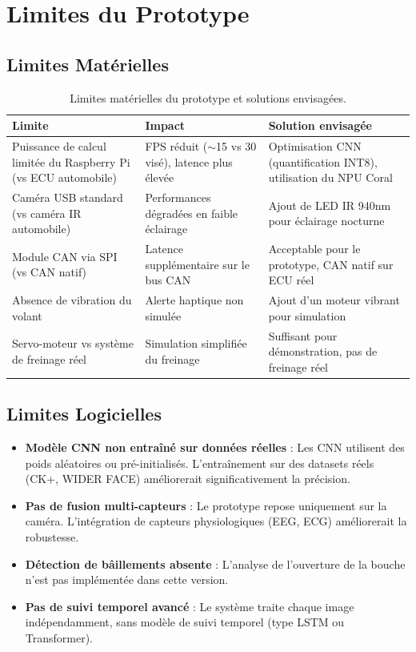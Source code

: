 \section{Limites du Prototype}

\subsection{Limites Matérielles}

\begin{table}[H]
\centering
\caption{Limites matérielles du prototype et solutions envisagées.}
\label{tab:limites_materielles}
\renewcommand{\arraystretch}{1.4}
\begin{tabularx}{\textwidth}{|X|X|X|}
\hline
\rowcolor{alertorange!20}
\textbf{Limite} & \textbf{Impact} & \textbf{Solution envisagée} \\
\hline
Puissance de calcul limitée du Raspberry Pi (vs ECU automobile) & FPS réduit ($\sim$15 vs 30 visé), latence plus élevée & Optimisation CNN (quantification INT8), utilisation du NPU Coral \\
\hline
Caméra USB standard (vs caméra IR automobile) & Performances dégradées en faible éclairage & Ajout de LED IR 940nm pour éclairage nocturne \\
\hline
Module CAN via SPI (vs CAN natif) & Latence supplémentaire sur le bus CAN & Acceptable pour le prototype, CAN natif sur ECU réel \\
\hline
Absence de vibration du volant & Alerte haptique non simulée & Ajout d'un moteur vibrant pour simulation \\
\hline
Servo-moteur vs système de freinage réel & Simulation simplifiée du freinage & Suffisant pour démonstration, pas de freinage réel \\
\hline
\end{tabularx}
\end{table}

\subsection{Limites Logicielles}

\begin{itemize}[leftmargin=2cm]
    \item \textbf{Modèle CNN non entraîné sur données réelles} : Les CNN utilisent des poids aléatoires ou pré-initialisés. L'entraînement sur des datasets réels (CK+, WIDER FACE) améliorerait significativement la précision.
    \item \textbf{Pas de fusion multi-capteurs} : Le prototype repose uniquement sur la caméra. L'intégration de capteurs physiologiques (EEG, ECG) améliorerait la robustesse.
    \item \textbf{Détection de bâillements absente} : L'analyse de l'ouverture de la bouche n'est pas implémentée dans cette version.
    \item \textbf{Pas de suivi temporel avancé} : Le système traite chaque image indépendamment, sans modèle de suivi temporel (type LSTM ou Transformer).
\end{itemize}

